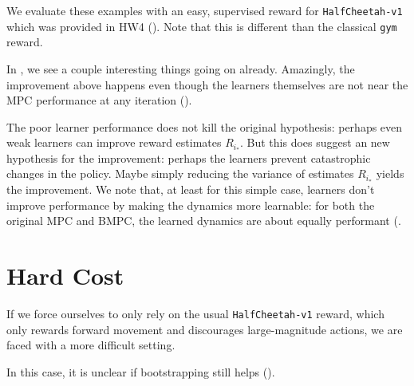 \documentclass{article}
\begin{document}
We evaluate these examples with an easy, supervised reward for \texttt{HalfCheetah-v1} which was provided in HW4 (). Note that this is different than the classical \texttt{gym} reward.


In , we see a couple interesting things going on already. Amazingly, the improvement above happens even though the learners themselves are not near the MPC performance at any iteration ().


The poor learner performance does not kill the original hypothesis: perhaps even weak learners can improve reward estimates $R_{i_*}$. But this does suggest an new hypothesis for the improvement: perhaps the learners prevent catastrophic changes in the policy. Maybe simply reducing the variance of estimates $R_{i_*}$ yields the improvement. We note that, at least for this simple case, learners don't improve performance by making the dynamics more learnable: for both the original MPC and BMPC, the learned dynamics are about equally performant (.


\section{Hard Cost}

If we force ourselves to only rely on the usual \texttt{HalfCheetah-v1} reward, which only rewards forward movement and discourages large-magnitude actions, we are faced with a more difficult setting.

In this case, it is unclear if bootstrapping still helps ().

\end{document}
